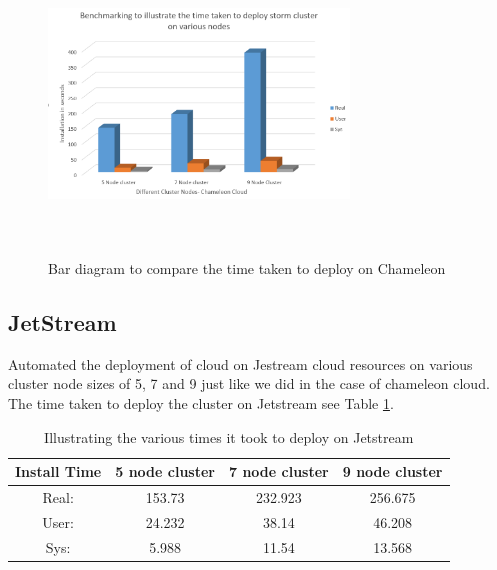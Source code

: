 \documentclass[9pt,twocolumn,twoside]{../../styles/osajnl}
\begin{document}
\begin{table}[htb]
\centering
\caption{Table illustrating the various times it took to deploy on Chameleon cloud}\label{T:bench1}
\end{table}



\begin{figure}[!htb]
  \includegraphics[width=8cm,height=8cm,keepaspectratio,width=\linewidth]{images/bar-1.png}
  \caption{Bar diagram to compare the time taken to deploy on Chameleon}
  \label{barc}
\end{figure}

\clearpage

\subsection{JetStream}

Automated the deployment of cloud on Jestream cloud resources on various cluster node sizes of 5, 7 and 9 just like we did in the case of chameleon cloud. The time taken to deploy the cluster on Jetstream see Table \ref{T:timejet}.


\begin{table}[!htb]
\centering
\caption{Illustrating the various times it took to deploy on Jetstream}\label{T:timejet}
 \begin{tabular}{|c|| c c c|} 
 \hline
 Install Time &  5 node cluster & 7 node cluster & 9 node cluster\\ [0.5ex]
 \hline\hline
 Real: &153.73 &232.923 & 256.675 \\ 
 \hline
 User: & 24.232 & 38.14 & 46.208 \\
 \hline
 Sys: & 5.988 &11.54 & 13.568  \\
 \hline
\end{tabular}
\end{table}
\end{document}
